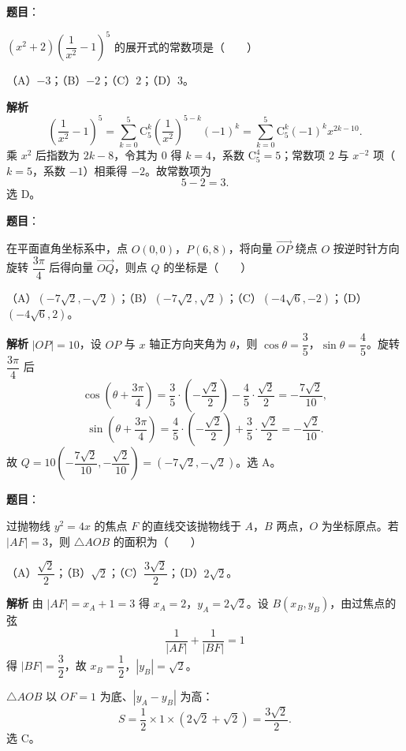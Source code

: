 \begin{answer}

\textbf{题目}：

$\left(x^2+2\right)\left(\dfrac1{x^2}-1\right)^5$ 的展开式的常数项是\mbox{（　　）}

（A）$-3$；（B）$-2$；（C）$2$；（D）$3$。

\textbf{解析}
\nopagebreak[4]
\[\left(\frac1{x^2}-1\right)^5=\sum_{k=0}^5\mathrm C_5^k\left(\frac1{x^2}\right)^{5-k}(-1)^k=\sum_{k=0}^5\mathrm C_5^k(-1)^kx^{2k-10}.\]
乘 $x^2$ 后指数为 $2k-8$，令其为 $0$ 得 $k=4$，系数 $\mathrm C_5^4=5$；常数项 $2$ 与 $x^{-2}$ 项（$k=5$，系数 $-1$）相乘得 $-2$。故常数项为
\nopagebreak[4]
\[5-2=3.\]
选 D。


\end{answer}
\begin{answer}

\textbf{题目}：

在平面直角坐标系中，点 $O(0,0)$，$P(6,8)$，将向量 $\overrightarrow{OP}$ 绕点 $O$ 按逆时针方向旋转 $\dfrac{3\pi}4$ 后得向量 $\overrightarrow{OQ}$，则点 $Q$ 的坐标是\mbox{（　　）}

（A）$\left(-7\sqrt2,-\sqrt2\right)$；（B）$\left(-7\sqrt2,\sqrt2\right)$；（C）$\left(-4\sqrt6,-2\right)$；（D）$\left(-4\sqrt6,2\right)$。

\textbf{解析}
$|OP|=10$，设 $OP$ 与 $x$ 轴正方向夹角为 $\theta$，则 $\cos\theta=\dfrac35$，$\sin\theta=\dfrac45$。旋转 $\dfrac{3\pi}4$ 后
\nopagebreak[4]
\[\cos\left(\theta+\frac{3\pi}4\right)=\frac35\cdot\left(-\frac{\sqrt2}2\right)-\frac45\cdot\frac{\sqrt2}2=-\frac{7\sqrt2}{10},\]
\nopagebreak[4]
\[\sin\left(\theta+\frac{3\pi}4\right)=\frac45\cdot\left(-\frac{\sqrt2}2\right)+\frac35\cdot\frac{\sqrt2}2=-\frac{\sqrt2}{10}.\]
故 $Q=10\left(-\dfrac{7\sqrt2}{10},-\dfrac{\sqrt2}{10}\right)=\left(-7\sqrt2,-\sqrt2\right)$。选 A。


\end{answer}
\begin{answer}

\textbf{题目}：

过抛物线 $y^2=4x$ 的焦点 $F$ 的直线交该抛物线于 $A$，$B$ 两点，$O$ 为坐标原点。若 $|AF|=3$，则 $\triangle AOB$ 的面积为\mbox{（　　）}

（A）$\dfrac{\sqrt2}2$；（B）$\sqrt2$；（C）$\dfrac{3\sqrt2}2$；（D）$2\sqrt2$。

\textbf{解析}
由 $|AF|=x_A+1=3$ 得 $x_A=2$，$y_A=2\sqrt2$。设 $B(x_B,y_B)$，由过焦点的弦
\nopagebreak[4]
\[\frac1{|AF|}+\frac1{|BF|}=1\]
得 $|BF|=\dfrac32$，故 $x_B=\dfrac12$，$|y_B|=\sqrt2$。

$\triangle AOB$ 以 $OF=1$ 为底、$|y_A-y_B|$ 为高：
\nopagebreak[4]
\[S=\frac12\times1\times(2\sqrt2+\sqrt2)=\frac{3\sqrt2}2.\]
选 C。


\end{answer}

